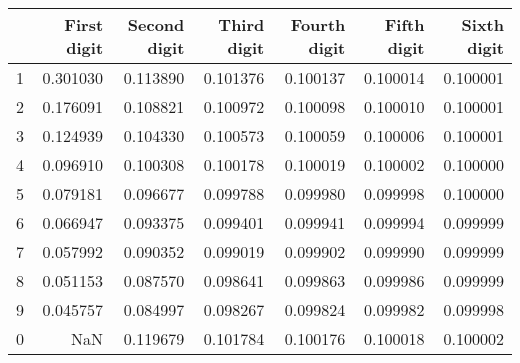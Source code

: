 \begin{tabular}{lrrrrrr}
\toprule
{} &  First digit &  Second digit &  Third digit &  Fourth digit &  Fifth digit &  Sixth digit \\
\midrule
1 &     0.301030 &      0.113890 &     0.101376 &      0.100137 &     0.100014 &     0.100001 \\
2 &     0.176091 &      0.108821 &     0.100972 &      0.100098 &     0.100010 &     0.100001 \\
3 &     0.124939 &      0.104330 &     0.100573 &      0.100059 &     0.100006 &     0.100001 \\
4 &     0.096910 &      0.100308 &     0.100178 &      0.100019 &     0.100002 &     0.100000 \\
5 &     0.079181 &      0.096677 &     0.099788 &      0.099980 &     0.099998 &     0.100000 \\
6 &     0.066947 &      0.093375 &     0.099401 &      0.099941 &     0.099994 &     0.099999 \\
7 &     0.057992 &      0.090352 &     0.099019 &      0.099902 &     0.099990 &     0.099999 \\
8 &     0.051153 &      0.087570 &     0.098641 &      0.099863 &     0.099986 &     0.099999 \\
9 &     0.045757 &      0.084997 &     0.098267 &      0.099824 &     0.099982 &     0.099998 \\
0 &          NaN &      0.119679 &     0.101784 &      0.100176 &     0.100018 &     0.100002 \\
\bottomrule
\end{tabular}

